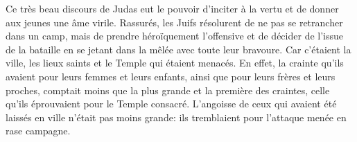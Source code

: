 Ce très beau discours de Judas eut le pouvoir d’inciter à la vertu
	et de donner aux jeunes une âme virile.
Rassurés, les Juifs résolurent de ne pas se retrancher dans un camp,
	mais de prendre héroïquement l’offensive
	et de décider de l’issue de la bataille
		en se jetant dans la mêlée avec toute leur bravoure.
Car c’étaient la ville, les lieux saints et le Temple qui étaient menacés.
En effet, la crainte qu’ils avaient pour leurs femmes et leurs enfants,
	ainsi que pour leurs frères et leurs proches,
	comptait moins que la plus grande et la première des craintes,
	celle qu’ils éprouvaient pour le Temple consacré.
L’angoisse de ceux qui avaient été laissés en ville n’était pas moins grande:
	ils tremblaient pour l’attaque menée en rase campagne.
